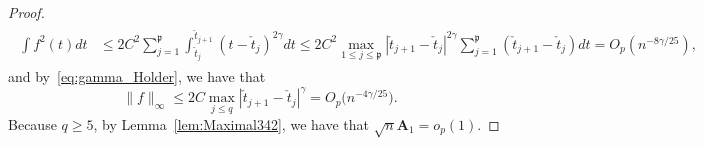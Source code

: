 {\begin{proof}
\begin{align}
\begin{split}
\int f^2(t) dt &\le 2C^2 \sum_{j=1}^\mathfrak{p}\int_{\check{t}_j}^{\check{t}_{j+1}} (t - \check{t}_j)^{2 \gamma}dt\le 2 C^2 \max_{1\le j\le \mathfrak{p}}|\check{t}_{j+1} - \check{t}_j|^{2 \gamma} \sum_{j=1}^\mathfrak{p} ( \check{t}_{j+1}- \check{t}_j)dt =O_p(n^{-8 \gamma/25}),
\end{split}
\end{align} 
and by~\eqref{eq:gamma_Holder}, we have that 
\begin{equation}\label{eq:f_inf_bound}
\|f\|_{\infty} \le 2 C \max_{j\le q} |\check{t}_{j+1} - \check{t}_j|^{\gamma} =O_p\big(n^{-4\gamma  /25}\big).
\end{equation}
Because $q\ge 5$,  by Lemma~\ref{lem:Maximal342}, we have that $\sqrt{n}\mathbf{A}_1 =o_p(1)$. \qedhere





\end{proof}}
